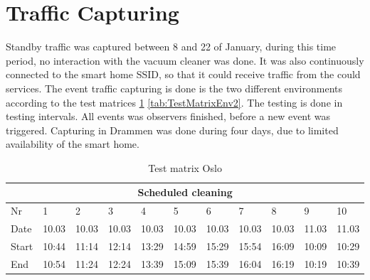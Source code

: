 \section{Traffic Capturing}
Standby traffic was captured between 8 and 22  of January, during this time period, no interaction with the vacuum cleaner was done. It was also continuously connected to the smart home SSID, so that it could receive traffic from the could services. The event traffic capturing is done is the two different environments according to the test matrices \ref{tab:TestMatrixEnv1} \ref{tab:TestMatrixEnv2}. The testing is done in testing intervals. All events was observers finished, before a new event was triggered. Capturing in Drammen was done during four days, due to limited availability of the smart home.  
\begin{table}[H]
\centering
\small
\caption{Test matrix Oslo}
\label{tab:TestMatrixEnv1}
\begin{tabular}{|lllllllllll|}
\hline
\multicolumn{11}{|c|}{\textbf{Scheduled cleaning}}                                                                                                                                                                                                                                                        \\ \hline
\multicolumn{1}{|l|}{Nr} & \multicolumn{1}{l|}{1}     & \multicolumn{1}{l|}{2}     & \multicolumn{1}{l|}{3}     & \multicolumn{1}{l|}{4}     & \multicolumn{1}{l|}{5}     & \multicolumn{1}{l|}{6}     & \multicolumn{1}{l|}{7}     & \multicolumn{1}{l|}{8}     & \multicolumn{1}{l|}{9}     & 10    \\ \hline
\multicolumn{1}{|l|}{Date}   & \multicolumn{1}{l|}{10.03} & \multicolumn{1}{l|}{10.03} & \multicolumn{1}{l|}{10.03} & \multicolumn{1}{l|}{10.03} & \multicolumn{1}{l|}{10.03} & \multicolumn{1}{l|}{10.03} & \multicolumn{1}{l|}{10.03} & \multicolumn{1}{l|}{10.03} & \multicolumn{1}{l|}{11.03} & 11.03 \\ \hline
\multicolumn{1}{|l|}{Start}  & \multicolumn{1}{l|}{10:44} & \multicolumn{1}{l|}{11:14} & \multicolumn{1}{l|}{12:14} & \multicolumn{1}{l|}{13:29} & \multicolumn{1}{l|}{14:59} & \multicolumn{1}{l|}{15:29} & \multicolumn{1}{l|}{15:54} & \multicolumn{1}{l|}{16:09} & \multicolumn{1}{l|}{10:09} & 10:29 \\ \hline
\multicolumn{1}{|l|}{End}    & \multicolumn{1}{l|}{10:54} & \multicolumn{1}{l|}{11:24} & \multicolumn{1}{l|}{12:24} & \multicolumn{1}{l|}{13:39} & \multicolumn{1}{l|}{15:09} & \multicolumn{1}{l|}{15:39} & \multicolumn{1}{l|}{16:04} & \multicolumn{1}{l|}{16:19} & \multicolumn{1}{l|}{10:19} & 10:39 \\ \hline

\end{tabular}
\end{table}
